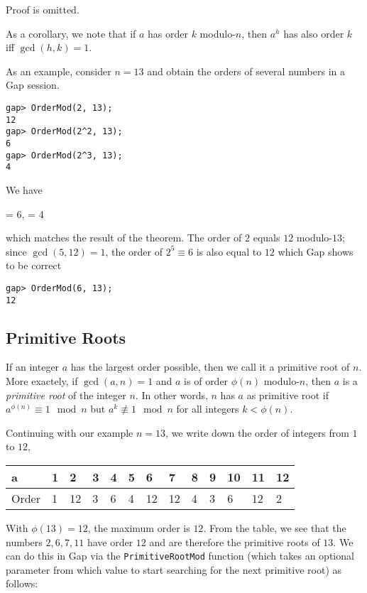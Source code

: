 Proof is omitted.

As a corollary, we note that if $a$ has order $k$ modulo-$n$, then $a^h$ has also order $k$ iff $\gcd(h,k)=1$.

As an example, consider $n=13$ and obtain the orders of several numbers in a Gap session.

\begin{verbatim}
gap> OrderMod(2, 13);
12
gap> OrderMod(2^2, 13);
6
gap> OrderMod(2^3, 13);
4
\end{verbatim}

We have

\bee
{} = 6, \quad {} = 4
\eee

which matches the result of the theorem. The order of $2$ equals $12$ modulo-$13$; since $\gcd(5, 12) = 1$, the order of $2^5 \equiv 6$ is also equal to $12$ which Gap shows to be correct

\begin{verbatim}
gap> OrderMod(6, 13);
12
\end{verbatim}

\subsection{Primitive Roots}\label{2021-03-02:primroots}

If an integer $a$ has the largest order possible, then we call it a primitive root of $n$. More exactely, if $\gcd(a,n)=1$ and $a$ is of order $\phi(n)$ modulo-$n$, then $a$ is a \emph{primitive root} of the integer $n$. In other words, $n$ has $a$ as primitive root if $a^{\phi(n)} \equiv 1 \mod n$ but $a^k \not \equiv 1 \mod n$ for all integers $k < \phi(n)$.

Continuing with our example $n=13$, we write down the order of integers from $1$ to $12$,

\vspace*{2mm}

\begin{tabular}{lllllllllllll}
  a     & 1 & 2  & 3 & 4 & 5 & 6  & 7  & 8 & 9 & 10 & 11 & 12 \\ \hline
  Order & 1 & 12 & 3 & 6 & 4 & 12 & 12 & 4 & 3 & 6  & 12 & 2 
\end{tabular}

\vspace*{2mm}

With $\phi(13) = 12$, the maximum order is $12$. From the table, we see that the numbers $2, 6, 7, 11$ have order $12$ and are therefore the primitive roots of $13$. We can do this in Gap via the \verb+PrimitiveRootMod+ function (which takes an optional parameter from which value to start searching for the next primitive root) as follows:

